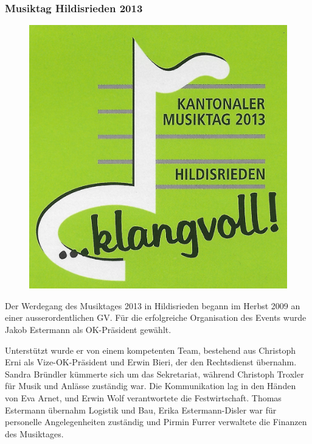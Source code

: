 \begin{history}


    \subsubsection*{Musiktag Hildisrieden 2013}

    \begin{figure}
        \includegraphics[width=\linewidth]{./chap/2001-2024/2013/Musiktag-Logo.jpg}
    \end{figure}

    Der Werdegang des Musiktages 2013 in Hildisrieden begann im Herbst 2009 an
    einer ausserordentlichen GV. Für die erfolgreiche Organisation des Events
    wurde Jakob Estermann als OK-Präsident gewählt.

    Unterstützt wurde er von einem kompetenten Team, bestehend aus Christoph
    Erni als Vize-OK-Präsident und Erwin Bieri, der den Rechtsdienst übernahm.
    Sandra Bründler kümmerte sich um das Sekretariat, während Christoph Troxler
    für Musik und Anlässe zuständig war. Die Kommunikation lag in den Händen von
    Eva Arnet, und Erwin Wolf verantwortete die Festwirtschaft. Thomas Estermann
    übernahm Logistik und Bau, Erika Estermann-Disler war für personelle
    Angelegenheiten zuständig und Pirmin Furrer verwaltete die Finanzen des
    Musiktages.


\end{history}
